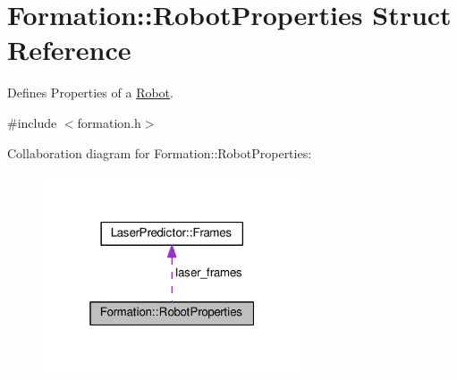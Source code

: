 \hypertarget{structFormation_1_1RobotProperties}{}\section{Formation\+:\+:Robot\+Properties Struct Reference}
\label{structFormation_1_1RobotProperties}


Defines Properties of a \hyperlink{structFormation_1_1Robot}{Robot}.  




{\ttfamily \#include $<$formation.\+h$>$}



Collaboration diagram for Formation\+:\+:Robot\+Properties\+:\nopagebreak
\begin{figure}[H]
\begin{center}
\leavevmode
\includegraphics[width=217pt]{structFormation_1_1RobotProperties__coll__graph}
\end{center}
\end{figure}
